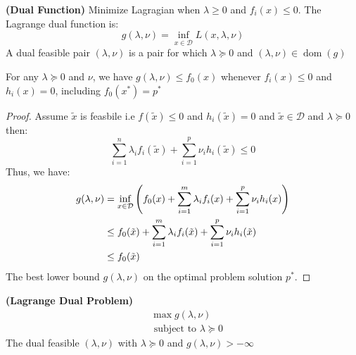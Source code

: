 \begin{definition}{\textbf{(Dual Function)}}
    Minimize Lagragian when $\lambda\ge0$ and $f_i(x)\le0$. The Lagrange dual function is:
    \begin{equation*}
        g(\lambda, \nu) = \inf_{x\in\mathcal{D}}L(x, \lambda, \nu)
    \end{equation*}
    A dual feasible pair $(\lambda, \nu)$ is a pair for which $\lambda\succeq0$ and $(\lambda, \nu)\in\operatorname{dom}(g)$
\end{definition}

\begin{proposition}
    For any $\lambda\succeq0$ and $\nu$, we have $g(\lambda,\nu)\le f_0(x)$ whenever $f_i(x)\le0$ and $h_i(x) =0$, including $f_0(x^*)=p^*$
\end{proposition}
\begin{proof}
    Assume $\tilde{x}$ is feasbile i.e $f(\tilde{x})\le0$ and $h_i(\tilde{x})=0$ and $\tilde{x}\in\mathcal{D}$ and $\lambda\succeq0$ then:
    \begin{equation*}
        \sum^n_{i=1}\lambda_if_i(\tilde{x}) + \sum^p_{i=1}\nu_ih_i(\tilde{x})\le0
    \end{equation*}
    Thus, we have:
    \begin{equation*}
    \begin{aligned}
        g(\lambda, \nu) &= \inf_{x\in\mathcal{D}}\left( f_0(x) + \sum^m_{i=1}\lambda_if_i(x) + \sum^p_{i=1}\nu_ih_i(x) \right) \\
        &\le f_0(\tilde{x}) + \sum^m_{i=1}\lambda_if_i(\tilde{x}) + \sum^p_{i=1}\nu_ih_i(\tilde{x}) \\
        &\le f_0(\tilde{x})
    \end{aligned}
    \end{equation*}
    The best lower bound $g(\lambda, \nu)$ on the optimal problem solution $p^*$.
\end{proof}

\begin{definition}{\textbf{(Lagrange Dual Problem)}}
    \begin{equation*}
    \begin{aligned}
        &\max g(\lambda, \nu) \\
        &\text{ subject to }\lambda\succeq0
    \end{aligned}
    \end{equation*}
    The dual feasible $(\lambda, \nu)$ with $\lambda\succeq0$ and $g(\lambda, \nu)>-\infty$
\end{definition}


